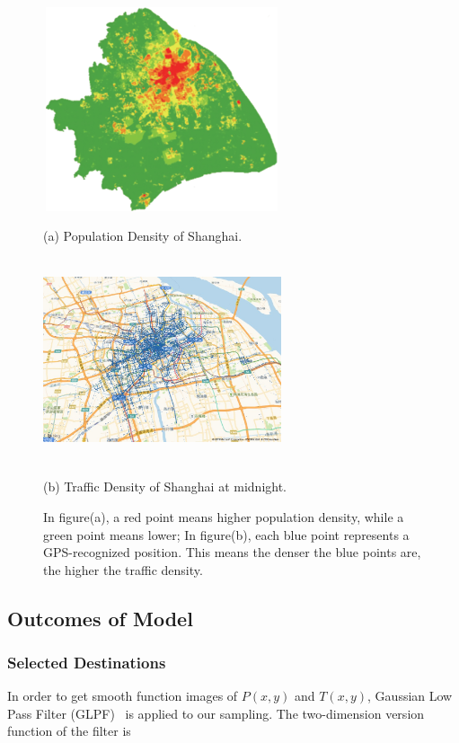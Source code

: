 \documentclass{mcmthesis}
\begin{document}
\begin{figure}[htbp]
    \begin{minipage}{0.44\linewidth}
      \centerline{\includegraphics[height=6cm,width=7cm]{figures/Pd.jpg}}
      \caption*{(a) Population Density of Shanghai.}
      \cite{dqxxkx_ppl}
    \end{minipage}
    \hspace{0.5in}
    \begin{minipage}{0.44\linewidth}
      \centerline{\includegraphics[height=6cm,width=7cm]{figures/Tran.png}}
      \caption*{(b) Traffic Density of Shanghai at midnight.}
    \end{minipage}
    \caption{In figure(a), a red point means higher population density, while a green point means lower; In figure(b), each blue point represents a GPS-recognized position. This means the denser the blue points are, the higher the traffic density.}
    \label{fig:two}
\end{figure}

\subsection{Outcomes of Model}

\subsubsection{Selected Destinations}
In order to get smooth function images of $P(x,y)$ and $T(x,y)$, Gaussian Low Pass Filter (GLPF)~\cite{DigitalImageProcessing} is applied to our sampling. The two-dimension version function of the filter is
\end{document}
